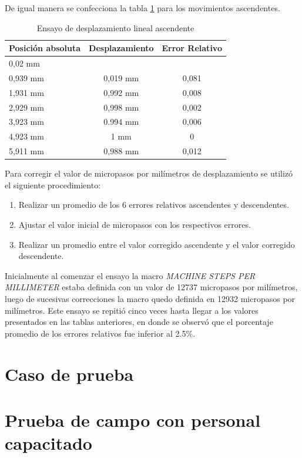 De igual manera se confecciona la tabla \ref{tab:ensayo_desplazamiento_asc} para los movimientos ascendentes.
 
\begin{table}[h!]
	\centering
	\caption[Ensayo de desplazamiento]{Ensayo de desplazamiento lineal ascendente}
	\begin{tabular}{l c c }    
		\toprule
		\textbf{Posición absoluta}     & \textbf{Desplazamiento} & \textbf{Error Relativo} \\
		\midrule
		0,02 mm	& 	        	& 	 			 	\\		
		0,939 mm    & 	0,019 mm    	& 	0,081	\\
		1,931 mm 	& 	0,992 mm	    & 	0,008 	\\
		2,929 mm	& 	0,998 mm	    & 	0,002 	\\
		3,923 mm 	& 	0.994 mm        & 	0,006	\\
		4,923 mm 	& 	1 mm	    	& 	0		\\
		5,911 mm 	& 	0,988 mm        & 	0,012 	\\
		\bottomrule
		\hline
	\end{tabular}
	\label{tab:ensayo_desplazamiento_asc}
\end{table}


Para corregir el valor de micropasos por milímetros de desplazamiento se utilizó el siguiente procedimiento:
\begin{enumerate}
\item Realizar un promedio de los 6 errores relativos ascendentes y descendentes.
\item Ajustar el valor inicial de micropasos con los respectivos errores. 
\item Realizar un promedio entre el valor corregido ascendente y el valor corregido descendente.
\end{enumerate}


Inicialmente al comenzar el ensayo la macro \textit{MACHINE STEPS PER MILLIMETER}  estaba definida con un valor de 12737 micropasos por milímetros, luego de sucesivas correcciones la macro quedo definida en 12932 micropasos por milímetros.
Este ensayo se repitió cinco veces hasta llegar a los valores presentados en las tablas anteriores, en donde se observó que el porcentaje promedio de los errores relativos fue inferior al 2.5\%.

\section{Caso de prueba}
\section{Prueba de campo con personal capacitado}

